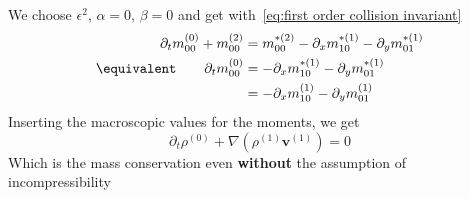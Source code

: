 We choose $\epsilon^2$, $\alpha=0$, $\beta=0$ and get with~\eqref{eq:first order collision invariant}
\begin{equation}
    \begin{aligned}
      \partial_t m_{00}^{(0)} + m_{00}^{(2)} & =  m_{00}^{*(2)} - \partial_x m_{10}^{*(1)} - \partial_y m_{01}^{*(1)} \\
      \equivalent \qquad \partial_t m_{00}^{(0)} & =  - \partial_x m_{10}^{*(1)} - \partial_y m_{01}^{*(1)} \\
      & =  - \partial_x m_{10}^{(1)} - \partial_y m_{01}^{(1)}
    \end{aligned}
\end{equation}
Inserting the macroscopic values for the moments, we get
\begin{equation}
  \partial_t \rho^{(0)} + \nabla (\rho^{(1)} \mathbf{v}^{(1)}) = 0
\end{equation}
Which is the mass conservation even \textbf{without} the assumption of incompressibility
